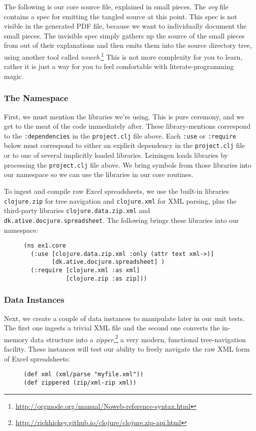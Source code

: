 \documentclass[11pt]{article}
\begin{document}
The following is our core source file, explained in small pieces.
The \emph{org} file contains a spec for emitting the tangled source at
this point. This spec is not visible in the generated PDF file,
because we want to individually document the small pieces. The
invisible spec simply gathers up the source of the small pieces from
out of their explanations and then emits them into the source
directory tree, using another tool called
\emph{noweb}.\footnote{\url{http://orgmode.org/manual/Noweb-reference-syntax.html}}
This is not more complexity for you to learn, rather it is just a
way for you to feel comfortable with literate-programming magic.
\subsubsection{The Namespace}
\label{sec-2-3-1}
First, we must mention the libraries we're using. This is pure
ceremony, and we get to the meat of the code immediately after. These
library-mentions correspond to the \verb|:dependencies| in the
\verb|project.clj| file above. Each \verb|:use| or \verb|:require|
below must correspond to either an explicit dependency in the
\verb|project.clj| file or to one of several implicitly loaded
libraries. Leiningen loads libraries by processing the
\verb|project.clj| file above. We bring symbols from those libraries
into our namespace so we can use the libraries in our core routines.

To ingest and compile raw Excel spreadsheets, we use the built-in
libraries \verb|clojure.zip| for tree navigation and
\verb|clojure.xml| for XML parsing, plus the third-party libraries
\verb|clojure.data.zip.xml| and \verb|dk.ative.docjure.spreadsheet|.
The following brings these libraries into our namespace:
\begin{figure}[H]
\label{main-namespace}
\begin{verbatim}
(ns ex1.core
  (:use [clojure.data.zip.xml :only (attr text xml->)]
        [dk.ative.docjure.spreadsheet] )
  (:require [clojure.xml :as xml]
            [clojure.zip :as zip]))
\end{verbatim}
\end{figure}
\subsubsection{Data Instances}
\label{sec-2-3-2}
Next, we create a couple of data instances to manipulate later in our
unit tests. The first one ingests a trivial XML file and the second
one converts the in-memory data structure into a
\emph{zipper},\footnote{\url{http://richhickey.github.io/clojure/clojure.zip-api.html}}
a very modern, functional tree-navigation facility. These instances
will test our ability to freely navigate the raw XML form of Excel
spreadsheets:
\begin{figure}[H]
\label{main-zippered}
\begin{verbatim}
(def xml (xml/parse "myfile.xml"))
(def zippered (zip/xml-zip xml))
\end{verbatim}
\end{figure}
\end{document}
